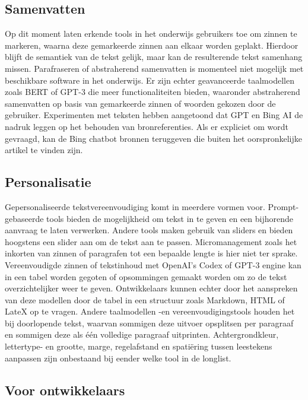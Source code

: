 \subsection{Samenvatten}

Op dit moment laten erkende tools in het onderwijs gebruikers toe om zinnen te markeren, waarna deze gemarkeerde zinnen aan elkaar worden geplakt. Hierdoor blijft de semantiek van de tekst gelijk, maar kan de resulterende tekst samenhang missen. Parafraseren of abstraherend samenvatten is momenteel niet mogelijk met beschikbare software in het onderwijs. Er zijn echter geavanceerde taalmodellen zoals BERT of GPT-3 die meer functionaliteiten bieden, waaronder abstraherend samenvatten op basis van gemarkeerde zinnen of woorden gekozen door de gebruiker. Experimenten met teksten hebben aangetoond dat GPT en Bing AI de nadruk leggen op het behouden van bronreferenties. Als er expliciet om wordt gevraagd, kan de Bing chatbot bronnen teruggeven die buiten het oorspronkelijke artikel te vinden zijn.

\subsection{Personalisatie}

Gepersonaliseerde tekstvereenvoudiging komt in meerdere vormen voor. Prompt-gebaseerde tools bieden de mogelijkheid om tekst in te geven en een bijhorende aanvraag te laten verwerken. Andere tools maken gebruik van sliders en bieden hoogstens een slider aan om de tekst aan te passen. Micromanagement zoals het inkorten van zinnen of paragrafen tot een bepaalde lengte is hier niet ter sprake. Vereenvoudigde zinnen of tekstinhoud met OpenAI's Codex of GPT-3 engine kan in een tabel worden gegoten of opsommingen gemaakt worden om zo de tekst overzichtelijker weer te geven. Ontwikkelaars kunnen echter door het aanspreken van deze modellen door de tabel in een structuur zoals Markdown, HTML of LateX op te vragen. Andere taalmodellen -en vereenvoudigingstools houden het bij doorlopende tekst, waarvan sommigen deze uitvoer opsplitsen per paragraaf en sommigen deze als één volledige paragraaf uitprinten. Achtergrondkleur, lettertype- en grootte, marge, regelafstand en spatiëring tussen leestekens aanpassen zijn onbestaand bij eender welke tool in de longlist.

\subsection{Voor ontwikkelaars}

